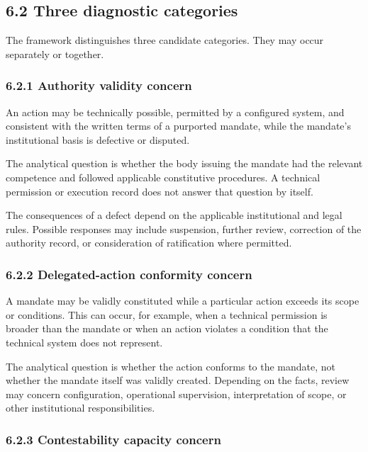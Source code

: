 \documentclass[
  10pt,
]{article}
\begin{document}
\subsection{6.2 Three diagnostic
categories}\label{three-diagnostic-categories}

The framework distinguishes three candidate categories. They may occur
separately or together.

\subsubsection{6.2.1 Authority validity
concern}\label{authority-validity-concern}

An action may be technically possible, permitted by a configured system,
and consistent with the written terms of a purported mandate, while the
mandate's institutional basis is defective or disputed.

The analytical question is whether the body issuing the mandate had the
relevant competence and followed applicable constitutive procedures. A
technical permission or execution record does not answer that question
by itself.

The consequences of a defect depend on the applicable institutional and
legal rules. Possible responses may include suspension, further review,
correction of the authority record, or consideration of ratification
where permitted.

\subsubsection{6.2.2 Delegated-action conformity
concern}\label{delegated-action-conformity-concern}

A mandate may be validly constituted while a particular action exceeds
its scope or conditions. This can occur, for example, when a technical
permission is broader than the mandate or when an action violates a
condition that the technical system does not represent.

The analytical question is whether the action conforms to the mandate,
not whether the mandate itself was validly created. Depending on the
facts, review may concern configuration, operational supervision,
interpretation of scope, or other institutional responsibilities.

\subsubsection{6.2.3 Contestability capacity
concern}\label{contestability-capacity-concern}
\end{document}
